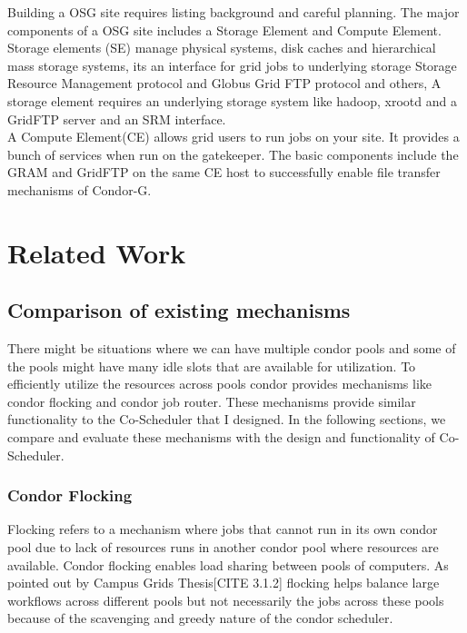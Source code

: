 \documentclass[ms,electronic,double]{nuthesis}
\begin{document}
Building a OSG site requires listing background and careful planning. The major 
components of a OSG site includes a Storage Element and Compute Element. \\

Storage elements (SE) manage physical systems, disk caches and hierarchical mass storage 
systems, its an interface for grid jobs to underlying storage Storage Resource Management protocol and Globus 
Grid FTP protocol and others, A storage element requires an underlying storage system like hadoop, xrootd
and a GridFTP server and an SRM interface.\\

A Compute Element(CE) allows grid users to run jobs on your site. It provides a 
bunch of services when run on the gatekeeper. The basic components include 
the GRAM and GridFTP on the same CE host to successfully enable file transfer 
mechanisms of Condor-G.\\


\chapter{Related Work}

\section{Comparison of existing mechanisms}
There might be situations where we can have multiple condor pools and some of 
the pools might have many idle slots that are available for utilization. To efficiently utilize the resources across pools condor provides 
mechanisms like condor flocking and condor job router. These mechanisms 
provide similar functionality to the Co-Scheduler that I designed. In the following sections, we compare 
and evaluate these mechanisms with the design and functionality of Co-Scheduler.

\subsection{Condor Flocking}
Flocking refers to a mechanism where jobs that cannot run in its own condor pool 
due to lack of resources runs in another condor pool where resources are 
available. Condor flocking enables load sharing between pools of computers. As 
pointed out by Campus Grids Thesis[CITE 3.1.2]  flocking helps balance large workflows across different pools but not 
necessarily the jobs across these pools because of the scavenging and greedy nature 
of the condor scheduler.
\end{document}
